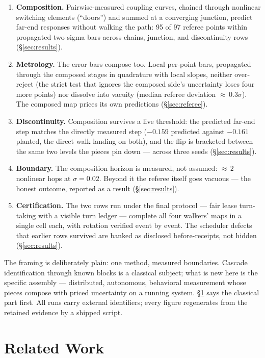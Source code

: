 \documentclass[11pt,a4paper]{article}
\begin{document}
\begin{enumerate}
\item \textbf{Composition.} Pairwise-measured coupling curves, chained
through nonlinear switching elements (``doors'') and summed at a
converging junction, predict far-end responses without walking the
path: 95 of 97 referee points within propagated two-sigma bars across
chains, junction, and discontinuity rows
(\S\ref{sec:results}).
\item \textbf{Metrology.} The error bars compose too. Local
per-point bars, propagated through the composed stages in quadrature
with local slopes, neither over-reject (the strict test that ignores
the composed side's uncertainty loses four more points) nor dissolve
into vacuity (median referee deviation ${\approx}\,0.3\sigma$). The
composed map prices its own predictions
(\S\ref{sec:referee}).
\item \textbf{Discontinuity.} Composition survives a live threshold:
the predicted far-end step matches the directly measured step
($-0.159$ predicted against $-0.161$ planted, the direct walk landing
on both), and the flip is bracketed between the same two levels the
pieces pin down --- across three seeds
(\S\ref{sec:results}).
\item \textbf{Boundary.} The composition horizon is measured, not
assumed: ${\approx}\,2$ nonlinear hops at $\sigma{=}0.02$. Beyond it
the referee itself goes vacuous --- the honest outcome, reported as a
result (\S\ref{sec:results}).
\item \textbf{Certification.} The two rows run under the final
protocol --- fair lease turn-taking with a visible turn ledger ---
complete all four walkers' maps in a single cell each, with rotation
verified event by event. The scheduler defects that earlier rows
survived are banked as disclosed before-receipts, not hidden
(\S\ref{sec:results}).
\end{enumerate}

The framing is deliberately plain: one method, measured boundaries.
Cascade identification through known blocks is a classical subject;
what is new here is the specific assembly --- distributed, autonomous,
behavioral measurement whose pieces compose with priced uncertainty on
a running system. \S\ref{sec:related} says the classical part first.
All runs carry external identifiers; every figure regenerates from the
retained evidence by a shipped script.

\section{Related Work}
\label{sec:related}
\end{document}
